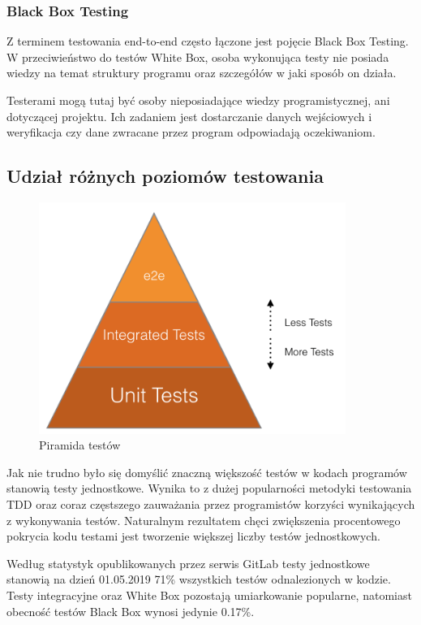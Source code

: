 \subsubsection{Black Box Testing}
Z terminem testowania end-to-end często łączone jest pojęcie Black Box Testing. W przeciwieństwo do testów White Box, osoba wykonująca testy nie posiada wiedzy na temat struktury programu oraz szczegółów w jaki sposób on działa. 

Testerami mogą tutaj być osoby nieposiadające wiedzy programistycznej, ani dotyczącej projektu. Ich zadaniem jest dostarczanie danych wejściowych i weryfikacja czy dane zwracane przez program odpowiadają oczekiwaniom.

\subsection{Udział różnych poziomów testowania}
\begin{figure}[htbp]
    \centering
    \includegraphics[width=10cm]{images/testing_triangle.png}
    \caption{Piramida testów}
    \label{fig:testing}
\end{figure}

Jak nie trudno było się domyślić znaczną większość testów w kodach programów stanowią testy jednostkowe. Wynika to z dużej popularności metodyki testowania TDD oraz coraz częstszego zauważania przez programistów korzyści wynikających z wykonywania testów. Naturalnym rezultatem chęci zwiększenia procentowego pokrycia kodu testami jest tworzenie większej liczby testów jednostkowych.

Według statystyk opublikowanych przez serwis GitLab\cite{GitLabTesting} testy jednostkowe stanowią na dzień 01.05.2019 71\% wszystkich testów odnalezionych w kodzie. Testy integracyjne oraz White Box pozostają umiarkowanie popularne, natomiast obecność testów Black Box wynosi jedynie 0.17\%.

